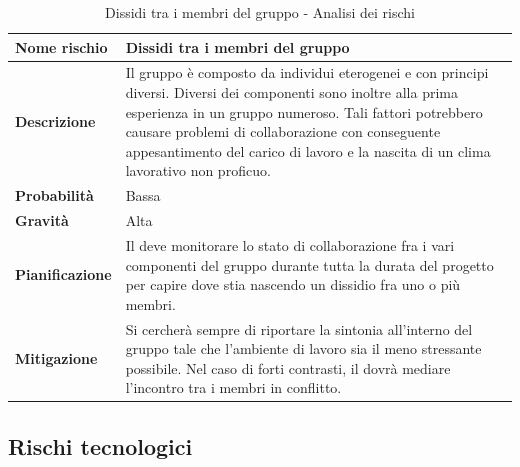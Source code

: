 \documentclass[12pt,a4paper]{article}
\begin{document}
\begin{table}[H]
	\begin{center}
		\begin{tabular}{p{} p{}}
			\toprule
			\textbf{Nome rischio} & \textbf{Dissidi tra i membri del gruppo} \\
			\midrule
			\midrule
			\textbf{Descrizione} & Il gruppo è composto da individui eterogenei e con principi diversi. Diversi dei componenti sono inoltre alla prima esperienza in un gruppo numeroso. Tali fattori potrebbero causare problemi di collaborazione con conseguente appesantimento del carico di lavoro e la nascita di un clima lavorativo non proficuo. \\
			\midrule
			\textbf{Probabilità} & Bassa \\
			\midrule
			\textbf{Gravità} & Alta \\
			\midrule
			\textbf{Pianificazione} & Il \PM{} deve monitorare lo stato di collaborazione fra i vari componenti del gruppo durante tutta la durata del progetto per capire dove stia nascendo un dissidio fra uno o più membri. \\
			\midrule
			\textbf{Mitigazione} & Si cercherà sempre di riportare la sintonia all’interno del gruppo tale che l’ambiente di lavoro sia il meno stressante possibile. Nel caso di forti contrasti, il \PM{} dovrà mediare l’incontro tra i membri in conflitto. \\
			\bottomrule
		\end{tabular}
		\caption{Dissidi tra i membri del gruppo - Analisi dei rischi}
	\end{center}
\end{table}

\subsection{Rischi tecnologici}
\end{document}

